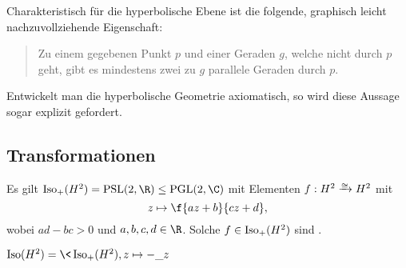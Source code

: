 Charakteristisch für die hyperbolische Ebene ist die folgende, graphisch leicht nachzuvollziehende Eigenschaft:
\begin{quote}
	Zu einem gegebenen Punkt $p$ und einer Geraden $g$, welche nicht durch $p$ geht, gibt es mindestens zwei zu $g$ parallele Geraden durch $p$.
\end{quote}
Entwickelt man die hyperbolische Geometrie axiomatisch, so wird diese Aussage sogar explizit gefordert.

\subsection{Transformationen}

Es gilt $\Iso_+(H^2) = \PSL(2, \R) \le \PGL(2, \C)$ mit Elementen
$f: H^2 \isomorphicto H^2$ mit
\[
	z \mapsto \f{az + b}{cz + d},
\]
wobei $ad - bc > 0$ und $a,b,c,d \in \R$.
Solche $f \in \operatorname{Iso}_+(H^2)$ sind .

$\Iso(H^2) = \< \Iso_+(H^2), z \mapsto -\_ z\>$

